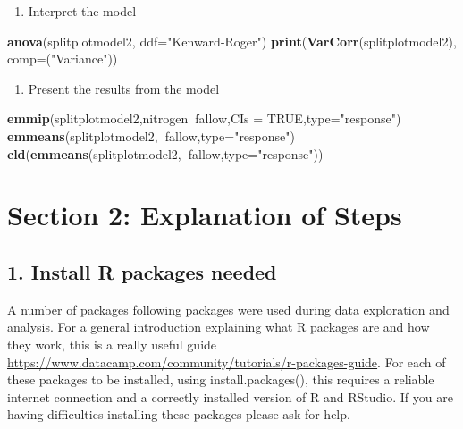 \documentclass[]{book}
\newenvironment{Shaded}{\begin{snugshade}}{\end{snugshade}}
\newcommand{\KeywordTok}[1]{\textcolor[rgb]{0.13,0.29,0.53}{\textbf{#1}}}
\newcommand{\DataTypeTok}[1]{\textcolor[rgb]{0.13,0.29,0.53}{#1}}
\newcommand{\StringTok}[1]{\textcolor[rgb]{0.31,0.60,0.02}{#1}}
\newcommand{\OtherTok}[1]{\textcolor[rgb]{0.56,0.35,0.01}{#1}}
\newcommand{\OperatorTok}[1]{\textcolor[rgb]{0.81,0.36,0.00}{\textbf{#1}}}
\newcommand{\NormalTok}[1]{#1}
\providecommand{\tightlist}{%
  \setlength{\itemsep}{0pt}\setlength{\parskip}{0pt}}
\theoremstyle{definition}
\theoremstyle{definition}
\theoremstyle{definition}
\theoremstyle{remark}
\begin{document}
\begin{enumerate}
\def\labelenumi{\arabic{enumi}.}
\setcounter{enumi}{6}
\tightlist
\item
  Interpret the model
\end{enumerate}

\begin{Shaded}
\begin{Highlighting}[]
\KeywordTok{anova}\NormalTok{(splitplotmodel2, }\DataTypeTok{ddf=}\StringTok{"Kenward-Roger"}\NormalTok{)}
\KeywordTok{print}\NormalTok{(}\KeywordTok{VarCorr}\NormalTok{(splitplotmodel2), }\DataTypeTok{comp=}\NormalTok{(}\StringTok{"Variance"}\NormalTok{))}
\end{Highlighting}
\end{Shaded}

\begin{enumerate}
\def\labelenumi{\arabic{enumi}.}
\setcounter{enumi}{7}
\tightlist
\item
  Present the results from the model
\end{enumerate}

\begin{Shaded}
\begin{Highlighting}[]
\KeywordTok{emmip}\NormalTok{(splitplotmodel2,nitrogen}\OperatorTok{~}\NormalTok{fallow,}\DataTypeTok{CIs =} \OtherTok{TRUE}\NormalTok{,}\DataTypeTok{type=}\StringTok{"response"}\NormalTok{)}
\KeywordTok{emmeans}\NormalTok{(splitplotmodel2,}\OperatorTok{~}\NormalTok{fallow,}\DataTypeTok{type=}\StringTok{"response"}\NormalTok{)}
\KeywordTok{cld}\NormalTok{(}\KeywordTok{emmeans}\NormalTok{(splitplotmodel2,}\OperatorTok{~}\NormalTok{fallow,}\DataTypeTok{type=}\StringTok{"response"}\NormalTok{))}
\end{Highlighting}
\end{Shaded}

\section{Section 2: Explanation of
Steps}\label{section-2-explanation-of-steps-1}

\subsection{1. Install R packages
needed}\label{install-r-packages-needed-1}

A number of packages following packages were used during data
exploration and analysis. For a general introduction explaining what R
packages are and how they work, this is a really useful guide
\url{https://www.datacamp.com/community/tutorials/r-packages-guide}. For
each of these packages to be installed, using install.packages(), this
requires a reliable internet connection and a correctly installed
version of R and RStudio. If you are having difficulties installing
these packages please ask for help.
\end{document}
